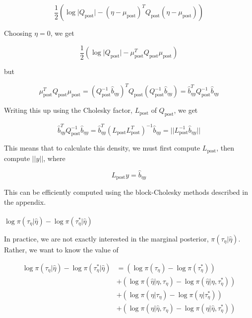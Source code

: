 \documentclass[
  letterpaper,
  DIV=11,
  numbers=noendperiod]{scrartcl}
\makeatletter
\let\oldparagraph\paragraph
\renewcommand{\paragraph}{
    \@ifstar
      \xxxParagraphStar
      \xxxParagraphNoStar
  }
\newcommand{\xxxParagraphStar}[1]{\oldparagraph*{#1}\mbox{}}
\newcommand{\xxxParagraphNoStar}[1]{\oldparagraph{#1}\mbox{}}
\makeatother
\begin{document}
\[
\frac12\left(\log\vert Q_\text{post}\vert - (\eta - \mu_\text{post})^TQ_\text{post}(\eta - \mu_\text{post}) \right)
\]

Choosing \(\eta = 0\), we get

\[
\frac12\left(\log\vert Q_\text{post}\vert - \mu_\text{post}^TQ_\text{post}\mu_\text{post} \right)
\]

but

\[
\mu_\text{post}^TQ_\text{post}\mu_\text{post} = (Q_\text{post}^{-1}\hat b_{\eta y})^T Q_\text{post}(Q_\text{post}^{-1}\hat b_{\eta y}) = \hat b_{\eta y}^TQ_\text{post}^{-1}\hat b_{\eta y}
\]

Writing this up using the Cholesky factor, \(L_\text{post}\) of
\(Q_\text{post}\), we get

\[
\hat b_{\eta y}^TQ_\text{post}^{-1}\hat b_{\eta y} = \hat b_{\eta y}^T(L_\text{post} L_\text{post}^T)^{-1}\hat b_{\eta y} = \vert\vert L_\text{post}^{-1}\hat b_{\eta y}\vert\vert
\]

This means that to calculate this density, we must first compute
\(L_\text{post}\), then compute \(\vert\vert y\vert \vert\), where

\[
L_\text{post}y = \hat b_{\eta y}
\]

This can be efficiently computed using the block-Cholesky methods
described in the appendix.

\paragraph{\texorpdfstring{\(\log \pi(\tau_\eta \vert \hat \eta) - \log \pi(\tau_\eta^* \vert \hat \eta)\)}{\textbackslash log \textbackslash pi(\textbackslash tau\_\textbackslash eta \textbackslash vert \textbackslash hat \textbackslash eta) - \textbackslash log \textbackslash pi(\textbackslash tau\_\textbackslash eta\^{}* \textbackslash vert \textbackslash hat \textbackslash eta)}}\label{log-pitau_eta-vert-hat-eta---log-pitau_eta-vert-hat-eta}

In practice, we are not exactly interested in the marginal posterior,
\(\pi(\tau_\eta \vert \hat \eta)\). Rather, we want to know the value of

\[
\begin{aligned}
\log \pi(\tau_\eta \vert \hat \eta) - \log \pi(\tau_\eta^* \vert \hat \eta) &= 
\left( \log\pi(\tau_\eta) - \log\pi(\tau_\eta^*) \right)  \\ 
&+\left( \log\pi(\hat \eta \vert \eta, \tau_\eta) - \log\pi(\hat \eta \vert \eta, \tau_\eta^*) \right) \\
&+ \left( \log\pi(\eta \vert \tau_\eta) - \log \pi(\eta \vert \tau_\eta^*) \right) \\
&+ \left( \log \pi(\eta \vert \hat \eta, \tau_\eta) - \log \pi(\eta \vert \hat \eta, \tau_\eta^*) \right)
\end{aligned}
\]
\end{document}

